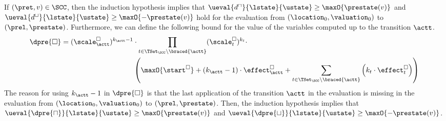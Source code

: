 If $(\pret, v) \in \SCC$, then the induction hypothesis implies that $\ueval{d^\sqcap}{\lstate}{\ustate} \geq \maxO{\prestate(v)}$ and $\ueval{d^\sqcup}{\lstate}{\ustate} \geq \maxO{-\prestate(v)}$ hold for the evaluation from $(\location_0, \valuation_0)$ to $(\prel, \prestate)$.
Furthermore, we can define the following bound for the value of the variables computed up to the transition $\actt$.
\begin{equation} \label{eq:induction_consequence}
  \begin{split}
  \dpre{\square} = (\scale^\square_\actt)^{k_\actt - 1} &\cdot \prod_{t \in \TSet_\SCC \setminus \braced{\actt}} (\scale^\square_t)^{k_t} \cdot \\
  & \left( \maxO{\start^\square} + \left( k_\actt - 1 \right) \cdot \effect^\square_\actt + \sum_{t \in \TSet_\SCC \setminus \braced{\actt}} \left( k_t \cdot \effect^\square_t \right) \right)
  \end{split}
\end{equation}
The reason for using $k_\actt - 1$ in $\dpre{\square}$ is that the last application of the transition $\actt$ in the evaluation is missing in the evaluation from $(\location_0, \valuation_0)$ to $(\prel, \prestate)$.
Then, the induction hypothesis implies that $\ueval{\dpre{\sqcap}}{\lstate}{\ustate} \geq \maxO{\prestate(v)}$ and $\ueval{\dpre{\sqcup}}{\lstate}{\ustate} \geq \maxO{-\prestate(v)}$.

